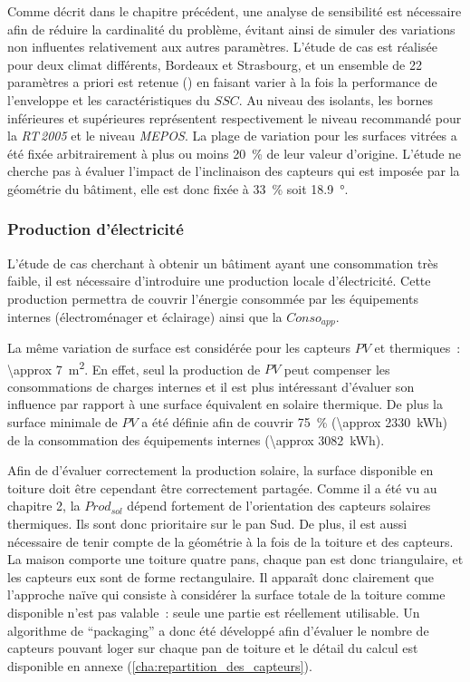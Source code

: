 Comme décrit dans le chapitre précédent, une analyse de sensibilité est nécessaire
afin de réduire la cardinalité du problème, évitant ainsi de simuler des variations
non influentes relativement aux autres paramètres.
L’étude de cas est réalisée pour deux climat différents, Bordeaux et Strasbourg,
et un ensemble de \num{22} paramètres a priori est retenue ()
en faisant varier à la fois la performance de l’enveloppe et les caractéristiques du $SSC$.
Au niveau des isolants, les bornes inférieures et supérieures représentent respectivement
le niveau recommandé pour la \textit{RT\,2005} et le niveau \textit{MEPOS}.
La plage de variation pour les surfaces vitrées a été fixée arbitrairement à plus ou moins \SI{20}{\percent}
de leur valeur d’origine. L’étude ne cherche pas à évaluer l’impact de l’inclinaison
des capteurs qui est imposée par la géométrie du bâtiment, elle est donc fixée à
\SI{33}{\percent} soit \SI{18.9}{\degree}.


\subsubsection{Production d’électricité} %
\label{ssub:production_d_electricite}
L’étude de cas cherchant à obtenir un bâtiment ayant une consommation très faible, il est
nécessaire d’introduire une production locale d’électricité. Cette production permettra de
couvrir l’énergie consommée par les équipements internes (électroménager et éclairage)
ainsi que la $Conso_{app}$.

La même variation de surface est considérée pour les capteurs $PV$ et thermiques~:
\SI{\approx 7}{\metre\squared}. En effet, seul la production de $PV$ peut
compenser les consommations de charges internes et il est plus intéressant d’évaluer son
influence par rapport à une surface équivalent en solaire thermique. De plus la surface
minimale de $PV$ a été définie afin de couvrir \SI{75}{\percent} (\SI{\approx 2330}{\kWh})
de la consommation des équipements internes (\SI{\approx 3082}{\kWh}).

Afin de d’évaluer correctement la production solaire, la surface disponible en toiture
doit être cependant être correctement partagée. Comme il a été vu au chapitre 2, la
$Prod_{sol}$ dépend fortement de l’orientation des capteurs solaires thermiques. Ils sont
donc prioritaire sur le pan Sud. De plus, il est aussi nécessaire de tenir compte de la
géométrie à la fois de la toiture et des capteurs. La maison comporte une toiture quatre
pans, chaque pan est donc triangulaire, et les capteurs eux sont de forme rectangulaire.
Il apparaît donc clairement que l’approche naïve qui consiste à considérer la surface
totale de la toiture comme disponible n’est pas valable~: seule une partie est réellement
utilisable. Un algorithme de \enquote{packaging} a donc été développé afin d’évaluer le
nombre de capteurs pouvant loger sur chaque pan de toiture et le détail du calcul est
disponible en annexe (\ref{cha:repartition_des_capteurs}).

